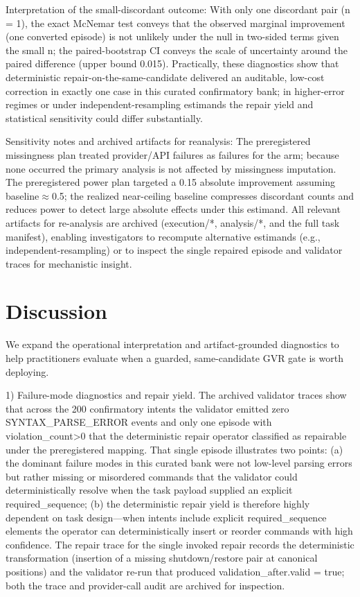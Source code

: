 \documentclass[conference]{IEEEtran}
\begin{document}
Interpretation of the small-discordant outcome: With only one discordant pair (n = 1), the exact McNemar test conveys that the observed marginal improvement (one converted episode) is not unlikely under the null in two-sided terms given the small n; the paired-bootstrap CI conveys the scale of uncertainty around the paired difference (upper bound 0.015). Practically, these diagnostics show that deterministic repair-on-the-same-candidate delivered an auditable, low-cost correction in exactly one case in this curated confirmatory bank; in higher-error regimes or under independent-resampling estimands the repair yield and statistical sensitivity could differ substantially.

Sensitivity notes and archived artifacts for reanalysis: The preregistered missingness plan treated provider/API failures as failures for the arm; because none occurred the primary analysis is not affected by missingness imputation. The preregistered power plan targeted a 0.15 absolute improvement assuming baseline\ensuremath{\approx}0.5; the realized near-ceiling baseline compresses discordant counts and reduces power to detect large absolute effects under this estimand. All relevant artifacts for re-analysis are archived (execution/*, analysis/*, and the full task manifest), enabling investigators to recompute alternative estimands (e.g., independent-resampling) or to inspect the single repaired episode and validator traces for mechanistic insight.

\section{Discussion}
We expand the operational interpretation and artifact-grounded diagnostics to help practitioners evaluate when a guarded, same-candidate GVR gate is worth deploying.

1) Failure-mode diagnostics and repair yield. The archived validator traces show that across the 200 confirmatory intents the validator emitted zero SYNTAX\_PARSE\_ERROR events and only one episode with violation\_count>0 that the deterministic repair operator classified as repairable under the preregistered mapping. That single episode illustrates two points: (a) the dominant failure modes in this curated bank were not low-level parsing errors but rather missing or misordered commands that the validator could deterministically resolve when the task payload supplied an explicit required\_sequence; (b) the deterministic repair yield is therefore highly dependent on task design---when intents include explicit required\_sequence elements the operator can deterministically insert or reorder commands with high confidence. The repair trace for the single invoked repair records the deterministic transformation (insertion of a missing shutdown/restore pair at canonical positions) and the validator re-run that produced validation\_after.valid = true; both the trace and provider-call audit are archived for inspection.
\end{document}
